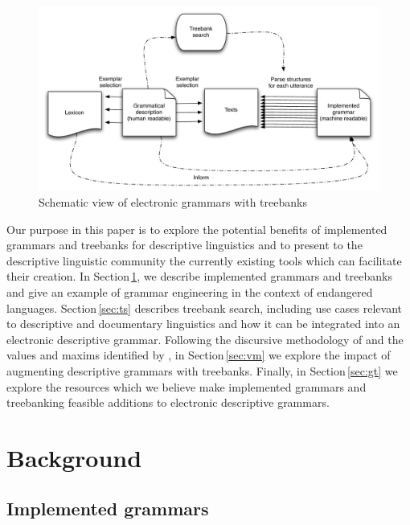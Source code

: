 \documentclass[12pt]{article}
\newcommand{\sref}[1]{Section$\,$\ref{#1}}
\begin{document}
\begin{figure}
\centering
\includegraphics[width=6.5in]{BigPicture3.pdf}
\caption{Schematic view of electronic grammars with treebanks}
\label{fig:bigpicture}
\end{figure}


Our purpose in this paper is to explore the potential benefits of
implemented grammars and treebanks for descriptive linguistics and to
present to the descriptive linguistic community the currently existing
tools which can facilitate their creation.  In \sref{sec:bg}, we
describe implemented grammars and treebanks and give an example of
grammar engineering in the context of endangered languages.
\sref{sec:ts} describes treebank search, including use cases relevant
to descriptive and documentary linguistics and how it can be
integrated into an electronic descriptive grammar.  Following the
discursive methodology of  and the values and
maxims identified by , in \sref{sec:vm} we
explore the impact of augmenting descriptive grammars with treebanks.
Finally, in \sref{sec:gt} we explore the resources which we believe make
implemented grammars and treebanking feasible additions to electronic
descriptive grammars.


\section{Background}
\label{sec:bg}

\subsection{Implemented grammars}
\label{sec:wmb}
\end{document}
